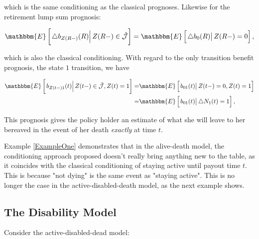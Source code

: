 \documentclass{book}
\newcommand{\1}[1]{\mathbbm{1}_{\left\lbrace #1 \right\rbrace}}
\newcommand{\econd}[2][def]{\mathbbm{E} \left[ \left. #1 \right| #2 \right]}
\theoremstyle{break}
\theoremstyle{remark}
\numberwithin{equation}{section}
\begin{document}
which is the same conditioning as the classical prognoses. Likewise for the retirement lump sum prognosis:

\begin{align*}
    \econd[\triangle b_{Z(R-)}(R)]{Z(R-) \in \hat{\mathcal{J}}} = \econd[\triangle b_0(R)]{Z(R-) = 0},
\end{align*}

which is also the classical conditioning. With regard to the only transition benefit prognosis, the state $1$ transition, we have

\begin{align*}
\econd[b_{Z(t-)1}(t)]{Z(t-) \in \hat{\mathcal{J}}, Z(t)=1} =& \econd[b_{01}(t)]{Z(t-)=0, Z(t)=1} \\
=& \econd[b_{01}(t)]{\triangle N_1(t) = 1},
\end{align*}

This prognosis gives the policy holder an estimate of what she will leave to her bereaved in the event of her death \textit{exactly} at time $t$.

Example \ref{ExampleOne} demonstrates that in the alive-death model, the conditioning approach proposed doesn't really bring anything new to the table, as it coincides with the classical conditioning of staying active until payout time $t$. This is because "not dying" is the same event as "staying active". This is no longer the case in the active-disabled-death model, as the next example shows.

\subsection{The Disability Model}

Consider the active-disabled-dead model:
\end{document}
